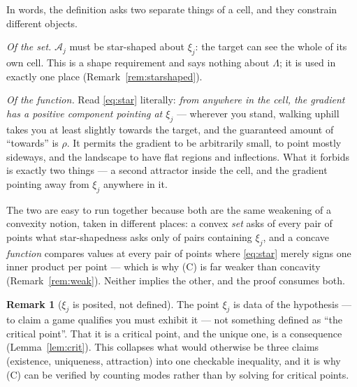 \documentclass[11pt]{article}
\theoremstyle{definition}
\newtheorem{remark}[theorem]{Remark}
\newcommand{\cA}{\mathcal{A}}
\begin{document}
In words, the definition asks two separate things of a cell, and they constrain
different objects.

\emph{Of the set.} $\cA_j$ must be star-shaped about $\xi_j$: the target can see
the whole of its own cell. This is a shape requirement and says nothing about
$\Lambda$; it is used in exactly one place (Remark~\ref{rem:starshaped}).

\emph{Of the function.} Read \eqref{eq:star} literally: \emph{from anywhere in the
cell, the gradient has a positive component pointing at $\xi_j$} --- wherever you
stand, walking uphill takes you at least slightly towards the target, and the
guaranteed amount of ``towards'' is $\rho$. It permits the gradient to be
arbitrarily small, to point mostly sideways, and the landscape to have flat
regions and inflections. What it forbids is exactly two things --- a second
attractor inside the cell, and the gradient pointing away from $\xi_j$ anywhere in
it.

The two are easy to run together because both are the same weakening of a
convexity notion, taken in different places: a convex \emph{set} asks of every
pair of points what star-shapedness asks only of pairs containing $\xi_j$, and a
concave \emph{function} compares values at every pair of points where
\eqref{eq:star} merely signs one inner product per point --- which is why (C) is
far weaker than concavity (Remark~\ref{rem:weak}). Neither implies the other, and
the proof consumes both.

\begin{remark}[$\xi_j$ is posited, not defined]\label{rem:posited}
The point $\xi_j$ is data of the hypothesis --- to claim a game qualifies you must
exhibit it --- not something defined as ``the critical point''. That it is a
critical point, and the unique one, is a consequence (Lemma~\ref{lem:crit}). This
collapses what would otherwise be three claims (existence, uniqueness,
attraction) into one checkable inequality, and it is why (C) can be verified by
counting modes rather than by solving for critical points.
\end{remark}
\end{document}
